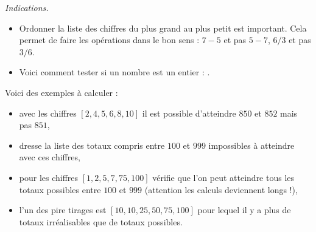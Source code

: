 \documentclass[11pt,class=report,crop=false]{standalone}
\begin{document}
\begin{activite}
\bigskip
\emph{Indications.}
\begin{itemize}
  \item Ordonner la liste des chiffres du plus grand au plus petit est important. Cela permet de faire les opérations dans le bon sens : $7-5$ et pas $5-7$, $6/3$ et pas $3/6$.
  \item Voici comment tester si un nombre est un entier : .
\end{itemize}

\bigskip

Voici des exemples à calculer :
\begin{itemize}
  \item avec les chiffres $[2, 4, 5, 6, 8, 10]$ il est possible d'atteindre $850$ et $852$ mais pas $851$,
  \item dresse la liste des totaux compris entre $100$ et $999$ impossibles à atteindre avec ces chiffres,
  \item pour les chiffres $[1, 2, 5, 7, 75, 100]$ vérifie que l'on peut atteindre tous les totaux possibles entre $100$ et $999$ (attention les calculs deviennent longs !),
  \item l'un des pire tirages est $[10, 10, 25, 50, 75, 100]$ pour lequel il y a plus de totaux irréalisables que de totaux possibles.
\end{itemize}

\end{activite}
\end{document}
